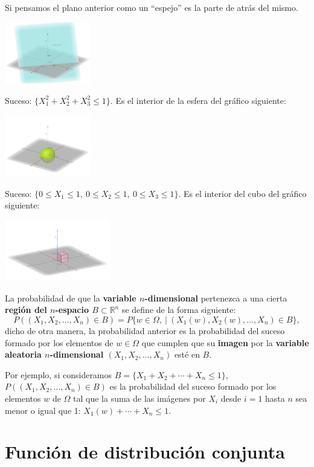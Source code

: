 \documentclass[
  letterpaper,
  DIV=11,
  numbers=noendperiod]{scrreprt}
\begin{document}
Si pensamos el plano anterior como un ``espejo'' es la parte de atrás
del mismo.

\includegraphics[width=1.48in,height=\textheight]{Images/EjPlano3D.png}

Suceso: \(\{X_1^2+X_2^2+X_3^2\leq 1\}\). Es el interior de la esfera del
gráfico siguiente:

\includegraphics[width=1.48in,height=\textheight]{Images/EjEsfera3D.png}

Suceso: \(\{0\leq X_1\leq 1,\ 0\leq X_2\leq 1,\ 0\leq X_3\leq 1\}\). Es
el interior del cubo del gráfico siguiente:

\includegraphics[width=1.81in,height=\textheight]{Images/Ej3DCubo.png}

La probabilidad de que la \textbf{variable \(n\)-dimensional} pertenezca
a una cierta \textbf{región del \(n\)-espacio \(B\subset \mathbb{R}^n\)}
se define de la forma siguiente: \[
P((X_1,X_2,\ldots,X_n)\in B)=P\{w\in \Omega,\ |\ (X_1(w),X_2(w),\ldots,X_n)\in B\},
\] dicho de otra manera, la probabilidad anterior es la probabilidad del
suceso formado por los elementos de \(w\in\Omega\) que cumplen que su
\textbf{imagen} por la \textbf{variable aleatoria \(n\)-dimensional
\((X_1,X_2,\ldots,X_n)\)} esté en \(B\).

Por ejemplo, si consideramos \(B=\{X_1+X_2+\cdots +X_n\leq 1\}\),
\(P((X_1,X_2,\ldots,X_n)\in B)\) es la probabilidad del suceso formado
por los elementos \(w\) de \(\Omega\) tal que la suma de las imágenes
por \(X_i\) desde \(i=1\) hasta \(n\) sea menor o igual que 1:
\(X_1(w)+\cdots +X_n\leq 1\).

\hypertarget{funciuxf3n-de-distribuciuxf3n-conjunta-1}{%
\section{Función de distribución
conjunta}\label{funciuxf3n-de-distribuciuxf3n-conjunta-1}}
\end{document}
